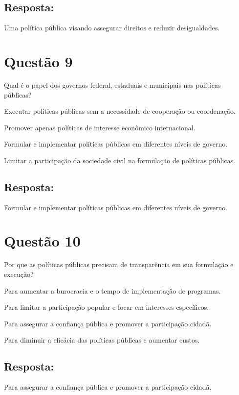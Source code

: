 \documentclass[
   article,       
   12pt,          
   oneside,       
   a4paper,       
   english,       
   brazil,        
   sumario=tradicional
   ]{abntex2}
\begin{document}
\subsection{Resposta:} Uma política pública visando assegurar direitos e reduzir desigualdades.
\section{Questão 9}
Qual é o papel dos governos federal, estaduais e municipais nas políticas públicas?
\itemize
    \item Executar políticas públicas sem a necessidade de cooperação ou coordenação.
    \item Promover apenas políticas de interesse econômico internacional.
    \item Formular e implementar políticas públicas em diferentes níveis de governo.
    \item Limitar a participação da sociedade civil na formulação de políticas públicas.
\subsection{Resposta:} Formular e implementar políticas públicas em diferentes níveis de governo.
\section{Questão 10}
Por que as políticas públicas precisam de transparência em sua formulação e execução?
\itemize
    \item Para aumentar a burocracia e o tempo de implementação de programas.
    \item Para limitar a participação popular e focar em interesses específicos.
    \item Para assegurar a confiança pública e promover a participação cidadã.
    \item Para diminuir a eficácia das políticas públicas e aumentar custos.
\subsection{Resposta:} Para assegurar a confiança pública e promover a participação cidadã.

\postextual

\end{document}
